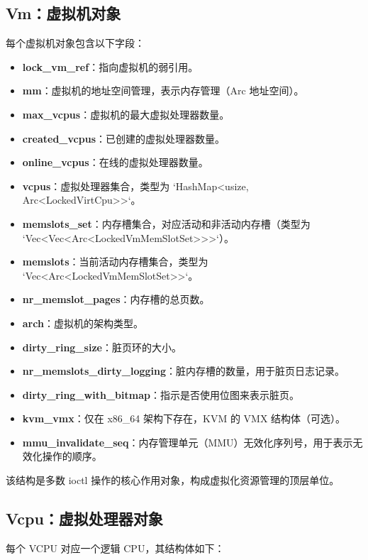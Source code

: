 \documentclass[analyze]{mancls}
\begin{document}
\subsection{Vm：虚拟机对象}
每个虚拟机对象包含以下字段：

\begin{itemize}
    \item \textbf{lock\_vm\_ref}：指向虚拟机的弱引用。
    \item \textbf{mm}：虚拟机的地址空间管理，表示内存管理（Arc 地址空间）。
    \item \textbf{max\_vcpus}：虚拟机的最大虚拟处理器数量。
    \item \textbf{created\_vcpus}：已创建的虚拟处理器数量。
    \item \textbf{online\_vcpus}：在线的虚拟处理器数量。
    \item \textbf{vcpus}：虚拟处理器集合，类型为 `HashMap<usize, Arc<LockedVirtCpu>>`。
    \item \textbf{memslots\_set}：内存槽集合，对应活动和非活动内存槽（类型为 `Vec<Vec<Arc<LockedVmMemSlotSet>>>`）。
    \item \textbf{memslots}：当前活动内存槽集合，类型为 `Vec<Arc<LockedVmMemSlotSet>>`。
    \item \textbf{nr\_memslot\_pages}：内存槽的总页数。
    \item \textbf{arch}：虚拟机的架构类型。
    \item \textbf{dirty\_ring\_size}：脏页环的大小。
    \item \textbf{nr\_memslots\_dirty\_logging}：脏内存槽的数量，用于脏页日志记录。
    \item \textbf{dirty\_ring\_with\_bitmap}：指示是否使用位图来表示脏页。
    \item \textbf{kvm\_vmx}：仅在 x86\_64 架构下存在，KVM 的 VMX 结构体（可选）。
    \item \textbf{mmu\_invalidate\_seq}：内存管理单元（MMU）无效化序列号，用于表示无效化操作的顺序。
\end{itemize}


该结构是多数 ioctl 操作的核心作用对象，构成虚拟化资源管理的顶层单位。

\subsection{Vcpu：虚拟处理器对象}
每个 VCPU 对应一个逻辑 CPU，其结构体如下：
\end{document}
